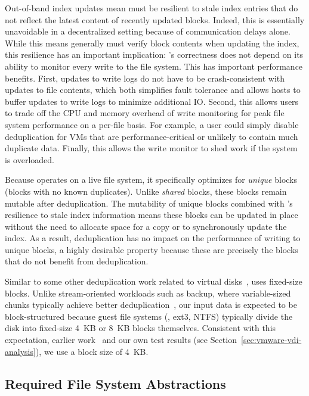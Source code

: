 
Out-of-band index updates mean \DeDe must be resilient to stale index
entries that do not reflect the latest content of recently updated
blocks.  Indeed, this is essentially unavoidable in a decentralized
setting because of communication delays alone.  While this means \DeDe
generally must verify block contents when updating the index, this
resilience has an important implication: \DeDe's correctness does not
depend on its ability to monitor every write to the file system.  This
has important performance benefits.  First, updates to write logs do
not have to be crash-consistent with updates to file contents, which
both simplifies fault tolerance and allows hosts to buffer updates to
write logs to minimize additional IO.  Second, this allows users to
trade off the CPU and memory overhead of write
monitoring for peak file system performance on a per-file basis.  For
example, a user could simply disable deduplication for VMs that are
performance-critical or unlikely to contain much duplicate data.
Finally, this allows the write monitor to shed work if the system is
overloaded.


Because \DeDe operates on a live file system, it specifically
optimizes for \emph{unique} blocks (blocks with no known duplicates).
Unlike \emph{shared} blocks, these blocks remain mutable after
deduplication.  The mutability of unique blocks combined with \DeDe's
resilience to stale index information means these blocks can be
updated in place without the need to allocate space for a copy or to
synchronously update the index.  As a result, deduplication has no
impact on the performance of writing to unique blocks, a highly
desirable property
because these are precisely the blocks that do not benefit from
deduplication.

Similar to some other deduplication work related to virtual
disks~\cite{cas-experiences,nath08hpccas}, \DeDe uses fixed-size
blocks.  Unlike stream-oriented workloads such as backup, where
variable-sized chunks typically achieve better
deduplication~\cite{zhu08datadomain}, our input data is expected to be
block-structured because guest file systems (\eg, ext3, NTFS)
typically divide the disk into fixed-size 4~KB or 8~KB blocks
themselves.  Consistent with this expectation, earlier
work~\cite{nath06vmcas} and our own test results (see
Section~\ref{sec:vmware-vdi-analysis}), we use a block size of 4~KB.

\subsection{Required File System Abstractions}
\label{sec:idea:compare-and-share}

